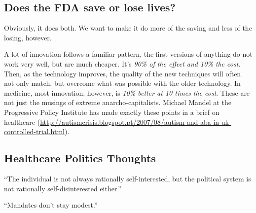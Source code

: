 \subsection{Does the FDA save or lose lives?}

Obviously, it does both. We want to make it do more of the saving and less of
the losing, however.

A lot of innovation follows a familiar pattern, the first versions of anything
do not work very well, but are much cheaper. It's \emph{90\% of the effect and
10\% the cost}. Then, as the technology improves, the quality of the new
techniques will often not only match, but overcome what was possible with the
older technology. In medicine, most innovation, however, is \emph{10\% better
at 10 times the cost}. These are not just the musings of extreme
anarcho-capitalists. Michael Mandel at the Progressive Policy Institute has
made exactly these points in a brief on healthcare
(\url{http://autismcrisis.blogspot.pt/2007/08/autism-and-aba-in-uk-controlled-trial.html}).

\subsection{Healthcare Politics Thoughts}

``The individual is not always rationally self-interested, but the political
system is not rationally self-disinterested either.''

``Mandates don't stay modest.''
